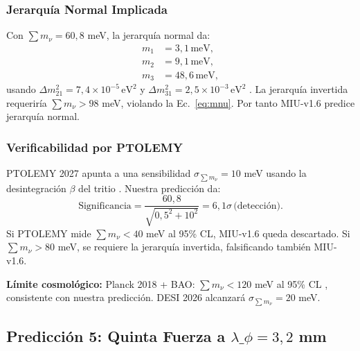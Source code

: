 \documentclass[12pt, a4paper]{article}
\theoremstyle{miuThm}
\theoremstyle{remark}
\begin{document}
\subsubsection{Jerarquía Normal Implicada}
Con $\sum m_\nu = 60{,}8$ meV, la jerarquía normal da:
\begin{align}
m_1 &= 3{,}1 \, \text{meV}, \nonumber \\
m_2 &= 9{,}1 \, \text{meV}, \nonumber \\
m_3 &= 48{,}6 \, \text{meV}, \label{eq:masses}
\end{align}
usando $\Delta m_{21}^2 = 7{,}4 \times 10^{-5} \, \text{eV}^2$ y
$\Delta m_{31}^2 = 2{,}5 \times 10^{-3} \, \text{eV}^2$ \cite{PDG2024}.
La jerarquía invertida requeriría $\sum m_\nu > 98$ meV, violando la
Ec.~\eqref{eq:mnu}. Por tanto MIU-v1.6 predice jerarquía normal.

\subsubsection{Verificabilidad por PTOLEMY}
PTOLEMY 2027 apunta a una sensibilidad $\sigma_{\sum m_\nu} = 10$ meV usando
la desintegración $\beta$ del tritio \cite{PTOLEMY2023}. Nuestra predicción da:
\begin{equation}
\text{Significancia} = \frac{60{,}8}{\sqrt{0{,}5^2 + 10^2}} = 6{,}1\sigma \, \text{(detección)}.
\label{eq:sigma_nu}
\end{equation}
Si PTOLEMY mide $\sum m_\nu < 40$ meV al 95\% CL, MIU-v1.6 queda descartado.
Si $\sum m_\nu > 80$ meV, se requiere la jerarquía invertida, falsificando también
MIU-v1.6.

\textbf{Límite cosmológico:} Planck 2018 + BAO: $\sum m_\nu < 120$ meV al 95\% CL
\cite{Planck2020}, consistente con nuestra predicción. DESI 2026 alcanzará
$\sigma_{\sum m_\nu} = 20$ meV.

\subsection{Predicción 5: Quinta Fuerza a $\lambda\_\phi = 3{,}2$ mm}
\label{subsec:fifthforce}
\end{document}
